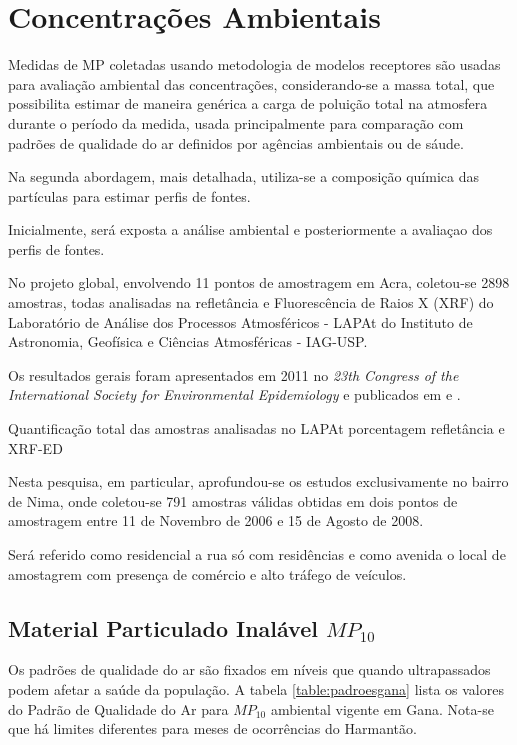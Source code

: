 \section{Concentrações Ambientais}

Medidas de MP coletadas usando metodologia de modelos receptores são usadas 
para avaliação ambiental das concentrações, considerando-se a massa total,
que possibilita estimar de maneira genérica a carga de poluição total na atmosfera 
durante o período da medida, usada principalmente para comparação com padrões
de qualidade do ar definidos por agências ambientais ou de sáude. 

Na segunda abordagem, mais detalhada, utiliza-se a composição química 
das partículas para estimar perfis de fontes. 

Inicialmente, será exposta a análise ambiental e posteriormente a 
avaliaçao dos perfis de fontes.  

No projeto global, envolvendo 11 pontos de amostragem em Acra, 
coletou-se 2898 amostras, todas analisadas na refletância e 
Fluorescência de Raios X (XRF) do 
Laboratório de Análise dos Processos Atmosféricos - LAPAt
do Instituto de Astronomia, Geofísica e Ciências Atmosféricas - IAG-USP.

Os resultados gerais foram apresentados em 2011 no
\textit{23th Congress of the International Society for Environmental 
Epidemiology} \citep{zhou2011} e publicados em \cite{zhou2013} e \cite{zhou2014}. 

\begin{table}[H]
  \centering
    
  \caption{Quantificação total das amostras analisadas no LAPAt porcentagem
          refletância e XRF-ED}
\end{table}

Nesta pesquisa, em particular, aprofundou-se os estudos exclusivamente no bairro
de Nima, onde coletou-se 791 amostras válidas obtidas em dois pontos de 
amostragem entre 11 de Novembro de 2006 e 15 de Agosto de 2008.

Será referido como residencial a rua só com residências e como avenida 
o local de amostagrem com presença de comércio e alto tráfego de veículos.

\subsection{Material Particulado Inalável $MP_{10}$}

Os padrões de qualidade do ar são fixados em níveis que quando ultrapassados 
podem afetar a saúde da população. 
A tabela \ref{table:padroesgana} lista os valores do Padrão de Qualidade do Ar 
para $MP_{10}$ ambiental vigente em Gana. Nota-se que há limites diferentes para 
meses de ocorrências do Harmantão. 

